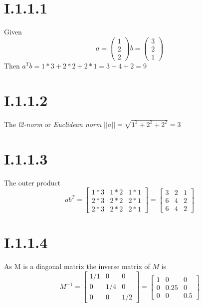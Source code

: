 \section*{I.1.1.1}
Given
\[
	a = \begin{pmatrix} 1\\2\\2 \end{pmatrix}
	b = \begin{pmatrix} 3\\2\\1 \end{pmatrix}
\]
Then $a^Tb = 1*3 + 2*2 + 2*1 = 3 + 4 + 2 = 9$

\section*{I.1.1.2}
The \textit{l2-norm} or \textit{Euclidean norm} $||a|| = \sqrt{1^2 + 2^2 + 2^2} = 3$

\section*{I.1.1.3}
The outer product
\[
	ab^T = \begin{bmatrix}
		1*3 & 1*2 & 1*1 \\
		2*3 & 2*2 & 2*1 \\
		2*3 & 2*2 & 2*1
	       \end{bmatrix}
	     = \begin{bmatrix}
		3 & 2 & 1 \\
		6 & 4 & 2 \\
		6 & 4 & 2
	       \end{bmatrix}
\]

\section*{I.1.1.4}
As M is a diagonal matrix the inverse matrix of $M$ is
\[
	M^{-1} = \begin{bmatrix}
		  1/1 & 0 & 0 \\
	  	  0 & 1/4 & 0 \\
		  0 & 0 & 1/2
		 \end{bmatrix}
	       = \begin{bmatrix}
		  1 & 0 & 0 \\
	  	  0 & 0.25 & 0 \\
		  0 & 0 & 0.5
		 \end{bmatrix}
\]

